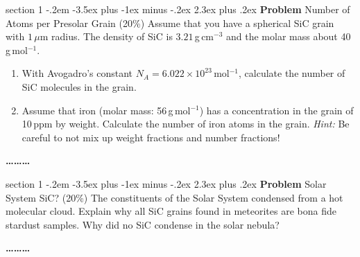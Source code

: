 \documentclass[letterpaper,12pt,twoside=false,DIV=11]{scrartcl}
\makeatletter
\newenvironment{problem}{\@startsection
    {section}
    {1}
    {-.2em}
    {-3.5ex plus -1ex minus -.2ex}
    {2.3ex plus .2ex}
    {
        \pagebreak[3] %
        \noindent\sffamily\bfseries Problem
    }
}
{
    \begin{center}\large\bfseries\ldots\ldots\ldots\end{center}
}
\makeatother
\begin{document}
\begin{problem}{Number of Atoms per Presolar Grain (20\%)}
Assume that you have a spherical SiC grain with $1\,\mu$m radius. The density of SiC is $3.21$\,g\,cm$^{-3}$ and the molar mass about 40\,g\,mol$^{-1}$. 
\begin{enumerate}
    \item With Avogadro's constant $N_A=6.022\times10^{23}$\,mol$^{-1}$, calculate the number of SiC molecules in the grain.
    \item Assume that iron (molar mass: 56\,g\,mol$^{-1}$) has a concentration in the grain of 10\,ppm by weight. Calculate the number of iron atoms in the grain. \textit{Hint:} Be careful to not mix up weight fractions and number fractions!
\end{enumerate}
\end{problem}

\begin{problem}{Solar System SiC? (20\%)}
The constituents of the Solar System condensed from a hot molecular cloud. Explain why all SiC grains found in meteorites are bona fide stardust samples. Why did no SiC condense in the solar nebula?
\end{problem}
\end{document}
